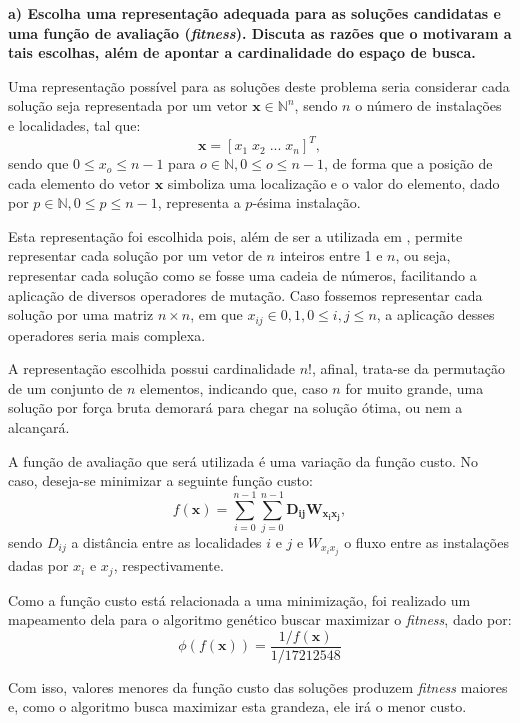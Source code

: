 \documentclass[a4paper, 12pt]{article}
\begin{document}
\textbf{a) Escolha uma representação adequada para as soluções candidatas e uma função de avaliação (\textit{fitness}). Discuta as razões que o motivaram a tais escolhas, além de apontar a cardinalidade do espaço de busca.}

Uma representação possível para as soluções deste problema seria considerar cada solução seja representada por um vetor $\mathbf{x} \in \mathbb{N}^n$, sendo $n$ o número de instalações e localidades, tal que:
$$\mathbf{x} = [x_1 \; x_2 \; ... \; x_{n}]^T,$$ 
sendo que $0 \leq x_o \leq n - 1$ para $o \in \mathbb{N}, 0 \leq o \leq n - 1$, de forma que a posição de cada elemento do vetor $\mathbf{x}$ simboliza uma localização e o valor do elemento, dado por $p \in \mathbb{N}, 0 \leq p \leq n - 1$, representa a $p$-ésima instalação.

Esta representação foi escolhida pois, além de ser a utilizada em \cite{elshafei1977hospital}, permite representar cada solução por um vetor de $n$ inteiros entre 1 e $n$, ou seja, representar cada solução como se fosse uma cadeia de números, facilitando a aplicação de diversos operadores de mutação. Caso fossemos representar cada solução por uma matriz $n \times n$, em que $x_{ij} \in 0, 1, 0 \leq i, j \leq n$, a aplicação desses operadores seria mais complexa.

A representação escolhida possui cardinalidade $n!$, afinal, trata-se da permu\-tação de um conjunto de $n$ elementos, indicando que, caso $n$ for muito grande, uma solução por força bruta demorará para chegar na solução ótima, ou nem a alcançará.

A função de avaliação que será utilizada é uma variação da função custo. No caso, deseja-se minimizar a seguinte função custo:
\begin{equation}\label{eq:custo}
    f(\mathbf{x}) = \sum_{i = 0}^{n - 1}  \sum_{j = 0}^{n - 1} \bm{D_{ij}} \bm{W_{x_{i} x_{j}}},
\end{equation}
sendo $D_{ij}$ a distância entre as localidades $i$ e $j$ e $W_{x_{i} x_{j}}$ o fluxo entre as instalações dadas por $x_i$ e $x_j$, respectivamente. 

Como a função custo está relacionada a uma minimização, foi realizado um mapeamento dela para o algoritmo genético buscar maximizar o \textit{fitness}, dado por:
\begin{equation}\label{eq:fitness}
    \phi(f(\mathbf{x})) = \frac{1/f(\mathbf{x})}{1/17212548}
\end{equation}

Com isso, valores menores da função custo das soluções produzem \textit{fitness} maiores e, como o algoritmo busca maximizar esta grandeza, ele irá o menor custo. 
\end{document}
